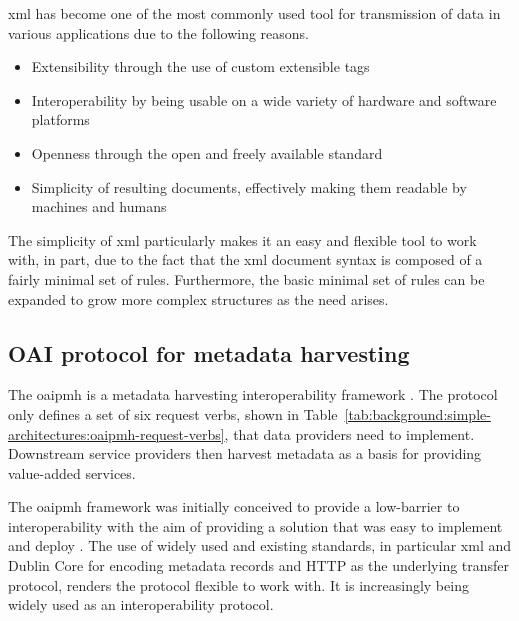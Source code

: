 \gls{xml} has become one of the most commonly used tool for transmission of data in various applications due to the following reasons.

\begin{itemize}
 \item Extensibility through the use of custom extensible tags
 \item Interoperability by being usable on a wide variety of hardware and software platforms
 \item Openness through the open and freely available standard
 \item Simplicity of resulting documents, effectively making them readable by machines and humans
\end{itemize}

The simplicity of \gls{xml} particularly makes it an easy and flexible tool to work with, in part, due to the fact that the \gls{xml} document syntax is composed of a fairly minimal set of rules. Furthermore, the basic minimal set of rules can be expanded to grow more complex structures as the need arises.

\subsection[OAI-PMH]{OAI protocol for metadata harvesting}
\label{sec:background:oaipmh-protocol-for-metadata-harvesting}

The \gls{oaipmh}  is a metadata harvesting interoperability framework \citep{Lagoze2002}. The protocol only defines a set of six request verbs, shown in Table~\ref{tab:background:simple-architectures:oaipmh-request-verbs}, that data providers need to implement. Downstream service providers then harvest metadata as a basis for providing value-added services.

\tablespacing

\bodyspacing

The \gls{oaipmh} framework was initially conceived to provide a low-barrier to interoperability with the aim of providing a solution that was easy to implement and deploy \citep{Lagoze2001}. The use of widely used and existing standards, in particular \gls{xml} and Dublin Core for encoding metadata records and HTTP as the underlying transfer protocol, renders the protocol flexible to work with. It is increasingly being widely used as an interoperability protocol.

